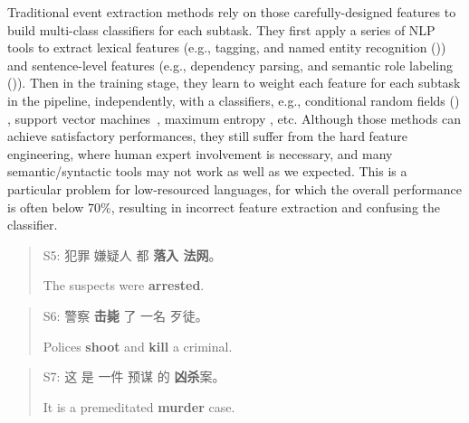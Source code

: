 Traditional event extraction methods \cite{ahn2006stages,chen2009language,li2012employing,chen2012joint} rely on those carefully-designed features to build multi-class classifiers for each subtask. They first apply a series of NLP tools to extract lexical features (e.g., \POS tagging, and named entity recognition (\NER)) and sentence-level features (e.g., dependency parsing, and semantic role labeling (\SRL)). Then in the training stage, they learn to weight each feature for each subtask in the pipeline, independently, with a classifiers, e.g., conditional random fields (\CRF) \cite{lafferty2001conditional}, support vector machines~\cite{suykens1999least}, maximum entropy \cite{phillips2006maximum}, etc. Although those methods can achieve satisfactory performances, they still suffer from the hard feature engineering, where human expert involvement is necessary,  and many semantic/syntactic tools may not work as well as we expected. This is a particular problem for low-resourced languages, for which the overall performance is often below 70\%, resulting in incorrect feature extraction and confusing the classifier.

\begin{quote}
	S5: 犯罪 嫌疑人 都 \textbf{落入 法网}。
	
	\hspace{0.55cm} The suspects were \textbf{arrested}.
\end{quote}
\begin{quote}
	S6: 警察 \textbf{击毙} 了 一名 歹徒。
	
	\hspace{0.55cm} Polices \textbf{shoot} and \textbf{kill} a criminal.
\end{quote}
\begin{quote}
	S7: 这 是 一件 预谋 的 \textbf{凶杀}案。
	
	\hspace{0.55cm} It is a premeditated \textbf{murder} case.
\end{quote}

